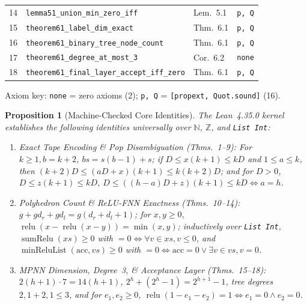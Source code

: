 \documentclass[10pt,twocolumn]{article}
\newtheorem{proposition}{Proposition}
\newcommand{\NN}{\mathbb{N}}
\newcommand{\ZZ}{\mathbb{Z}}
\newcommand{\relu}{\operatorname{relu}}
\begin{document}
\begin{table}[t]
\begin{tabular}{@{}rlll@{}}
14 & \texttt{lemma51\_union\_min\_zero\_iff} & Lem.~5.1 & \texttt{p, Q} \\
15 & \texttt{theorem61\_label\_dim\_exact} & Thm.~6.1 & \texttt{p, Q} \\
16 & \texttt{theorem61\_binary\_tree\_node\_count} & Thm.~6.1 & \texttt{p, Q} \\
17 & \texttt{theorem61\_degree\_at\_most\_3} & Cor.~6.2 & \texttt{none} \\
18 & \texttt{theorem61\_final\_layer\_accept\_iff\_zero} & Thm.~6.1 & \texttt{p, Q} \\
\bottomrule
\end{tabular}
\vspace{-0.4em}
\begin{flushleft}
\tiny Axiom key: \texttt{none} = zero axioms (2); \texttt{p, Q} = \texttt{[propext, Quot.sound]} (16).
\end{flushleft}
\vspace{-0.8em}
\end{table}

\begin{proposition}[Machine-Checked Core Identities]\label{prop:lean}
The Lean~4.35.0 kernel establishes the following identities universally over $\NN$, $\ZZ$, and \texttt{List Int}:
\begin{enumerate}[leftmargin=*,nosep]
  \item \emph{Exact Tape Encoding \& Pop Disambiguation (Thms.~1--9):} For $k \ge 1, b = k + 2$, $b s = s(b-1) + s$; if $D \le x(k+1) \le kD$ and $1 \le a \le k$, then $(k+2)D \le (aD+x)(k+1) \le k(k+2)D$; and for $D > 0$, $D \le z(k+1) \le kD$, $D \le ((h-a)D+z)(k+1) \le kD \iff a = h$.
  \item \emph{Polyhedron Count \& ReLU-FNN Exactness (Thms.~10--14):} $g + g d_r + g d_l = g(d_r + d_l + 1)$; for $x, y \ge 0$, $\relu(x - \relu(x - y)) = \min(x, y)$; inductively over \texttt{List Int}, $\operatorname{sumRelu}(xs) \ge 0$ with $= 0 \iff \forall v \in xs, v \le 0$, and $\operatorname{minReluList}(\mathrm{acc}, vs) \ge 0$ with $= 0 \iff \mathrm{acc} = 0 \lor \exists v \in vs, v = 0$.
  \item \emph{MPNN Dimension, Degree~3, \& Acceptance Layer (Thms.~15--18):} $2(h+1)\cdot 7 = 14(h+1)$, $2^h + (2^h - 1) = 2^{h+1} - 1$, tree degrees $2, 1+2, 1 \le 3$, and for $e_1, e_2 \ge 0$, $\relu(1 - e_1 - e_2) = 1 \iff e_1 = 0 \land e_2 = 0$.
\end{enumerate}
\end{proposition}
\end{document}
